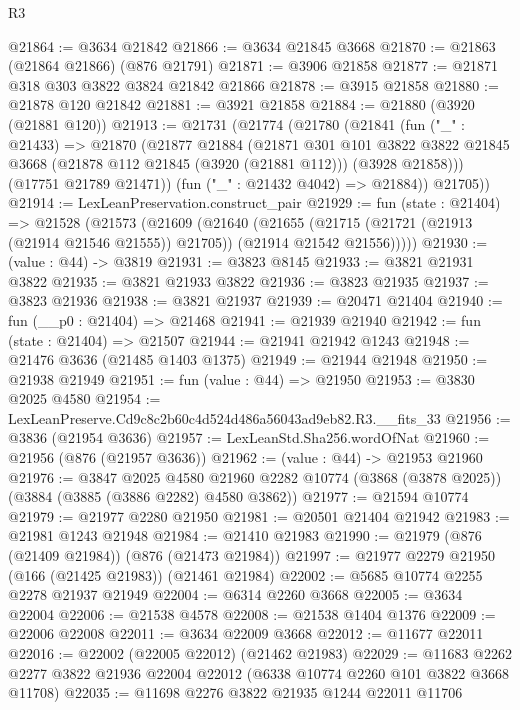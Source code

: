 \begin{lexlean}{R3}
\begin{coremodule}
@21864 := @3634 @21842
@21866 := @3634 @21845 @3668
@21870 := @21863 (@21864 @21866) (@876 @21791)
@21871 := @3906 @21858
@21877 := @21871 @318 @303 @3822 @3824 @21842 @21866
@21878 := @3915 @21858
@21880 := @21878 @120 @21842
@21881 := @3921 @21858
@21884 := @21880 (@3920 (@21881 @120))
@21913 := @21731
    (@21774
      (@21780
        (@21841
          (fun ("_" : @21433) =>
          @21870
            (@21877
              @21884
              (@21871
                @301
                @101
                @3822
                @3822
                @21845
                @3668
                (@21878 @112 @21845 (@3920 (@21881 @112)))
                (@3928 @21858)))
            (@17751 @21789 @21471))
          (fun ("_" : @21432 @4042) => @21884))
        @21705))
@21914 := LexLeanPreservation.construct_pair
@21929 := fun (state : @21404) =>
  @21528
    (@21573
      (@21609
        (@21640
          (@21655
            (@21715 (@21721 (@21913 (@21914 @21546 @21555)) @21705))
            (@21914 @21542 @21556)))))
@21930 := (value : @44) -> @3819
@21931 := @3823 @8145
@21933 := @3821 @21931 @3822
@21935 := @3821 @21933 @3822
@21936 := @3823 @21935
@21937 := @3823 @21936
@21938 := @3821 @21937
@21939 := @20471 @21404
@21940 := fun (__p0 : @21404) => @21468
@21941 := @21939 @21940
@21942 := fun (state : @21404) => @21507
@21944 := @21941 @21942 @1243
@21948 := @21476 @3636 (@21485 @1403 @1375)
@21949 := @21944 @21948
@21950 := @21938 @21949
@21951 := fun (value : @44) => @21950
@21953 := @3830 @2025 @4580
@21954 := LexLeanPreserve.Cd9c8c2b60c4d524d486a56043ad9eb82.R3.__fits_33
@21956 := @3836 (@21954 @3636)
@21957 := LexLeanStd.Sha256.wordOfNat
@21960 := @21956 (@876 (@21957 @3636))
@21962 := (value : @44) -> @21953 @21960
@21976 := @3847
    @2025
    @4580
    @21960
    @2282
    @10774
    (@3868 (@3878 @2025))
    (@3884 (@3885 (@3886 @2282) @4580 @3862))
@21977 := @21594 @10774
@21979 := @21977 @2280 @21950
@21981 := @20501 @21404 @21942
@21983 := @21981 @1243 @21948
@21984 := @21410 @21983
@21990 := @21979 (@876 (@21409 @21984)) (@876 (@21473 @21984))
@21997 := @21977 @2279 @21950 (@166 (@21425 @21983)) (@21461 @21984)
@22002 := @5685 @10774 @2255 @2278 @21937 @21949
@22004 := @6314 @2260 @3668
@22005 := @3634 @22004
@22006 := @21538 @4578
@22008 := @21538 @1404 @1376
@22009 := @22006 @22008
@22011 := @3634 @22009 @3668
@22012 := @11677 @22011
@22016 := @22002 (@22005 @22012) (@21462 @21983)
@22029 := @11683 @2262 @2277 @3822 @21936 @22004 @22012 (@6338 @10774 @2260 @101 @3822 @3668 @11708)
@22035 := @11698 @2276 @3822 @21935 @1244 @22011 @11706

\end{coremodule}
\end{lexlean}
